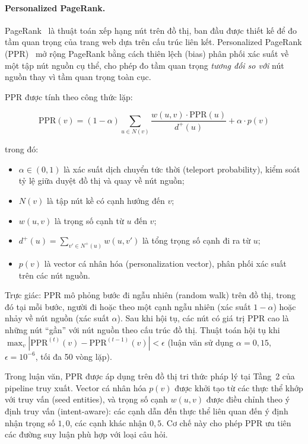 \paragraph{Personalized PageRank.}
\label{sec:cslt-ppr}
PageRank~\cite{gleich2015pagerank} là thuật toán xếp hạng nút trên đồ thị, ban đầu
được thiết kế để đo tầm quan trọng của trang web dựa trên cấu trúc liên kết.
Personalized PageRank (PPR)~\cite{haveliwala2002ppr,jeh2003ppr} mở rộng PageRank
bằng cách thiên lệch (bias) phân phối xác suất về một tập nút nguồn cụ thể, cho
phép đo tầm quan trọng \textit{tương đối so với} nút nguồn thay vì tầm quan trọng
toàn cục.

PPR được tính theo công thức lặp:

\begin{equation}
  \text{PPR}(v) = (1 - \alpha) \sum_{u \in N(v)}
  \frac{w(u,v) \cdot \text{PPR}(u)}{d^{+}(u)}
  + \alpha \cdot p(v)
  \label{eq:ppr-def}
\end{equation}

\noindent trong đó:
\begin{itemize}
  \item $\alpha \in (0,1)$ là xác suất dịch chuyển tức thời (teleport probability),
        kiểm soát tỷ lệ giữa duyệt đồ thị và quay về nút nguồn;
  \item $N(v)$ là tập nút kề có cạnh hướng đến $v$;
  \item $w(u,v)$ là trọng số cạnh từ $u$ đến $v$;
  \item $d^{+}(u) = \sum_{v' \in N^{+}(u)} w(u, v')$ là tổng trọng số cạnh đi ra
        từ $u$;
  \item $p(v)$ là vector cá nhân hóa (personalization vector), phân phối xác suất trên
        các nút nguồn.
\end{itemize}

Trực giác: PPR mô phỏng bước đi ngẫu nhiên (random walk) trên đồ thị, trong đó tại
mỗi bước, người đi hoặc theo một cạnh ngẫu nhiên (xác suất $1 - \alpha$) hoặc nhảy
về nút nguồn (xác suất $\alpha$). Sau khi hội tụ, các nút có giá trị PPR cao là
những nút ``gần'' với nút nguồn theo cấu trúc đồ thị. Thuật toán hội tụ khi
$\max_v |\text{PPR}^{(t)}(v) - \text{PPR}^{(t-1)}(v)| < \epsilon$ (luận văn sử dụng
$\alpha = 0{,}15$, $\epsilon = 10^{-6}$, tối đa 50 vòng lặp).

Trong luận văn, PPR được áp dụng trên đồ thị tri thức pháp lý tại Tầng~2 của
pipeline truy xuất. Vector cá nhân hóa $p(v)$ được khởi tạo từ các thực thể khớp
với truy vấn (seed entities), và trọng số cạnh $w(u,v)$ được điều chỉnh theo ý
định truy vấn (intent-aware): các cạnh dẫn đến thực thể liên quan đến ý định nhận
trọng số $1{,}0$, các cạnh khác nhận $0{,}5$. Cơ chế này cho phép PPR ưu tiên các
đường suy luận phù hợp với loại câu hỏi.


